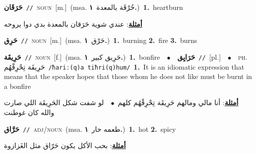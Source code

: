\documentclass[10pt,a4paper,twoside]{article} %
\begin{document}
\begin{multicols}{2}
{\setlength\topsep{0pt}\textbf{\foreignlanguage{arabic}{حَرَقَان}}\ {\color{gray}\texttt{//}\color{black}}\ \textsc{noun}\ [m.]\ \color{gray}(msa. \foreignlanguage{arabic}{حُرْقَة بالمعدة}~\foreignlanguage{arabic}{\textbf{١.}})\color{black}\ \textbf{1.}~heartburn\  \begin{flushright}\color{gray}\foreignlanguage{arabic}{\textbf{\underline{\foreignlanguage{arabic}{أمثلة}}}: عندي شوية حَرَقان بالمعدة بدي دوا يروحه}\end{flushright}\color{black}} \vspace{2mm}

{\setlength\topsep{0pt}\textbf{\foreignlanguage{arabic}{حَرِق}}\ {\color{gray}\texttt{//}\color{black}}\ \textsc{noun}\ [m.]\ \color{gray}(msa. \foreignlanguage{arabic}{حَرْق}~\foreignlanguage{arabic}{\textbf{١.}})\color{black}\ \textbf{1.}~burning  \textbf{2.}~fire  \textbf{3.}~burns\ } \vspace{2mm}

{\setlength\topsep{0pt}\textbf{\foreignlanguage{arabic}{حَرِيقَة}}\ {\color{gray}\texttt{//}\color{black}}\ \textsc{noun}\ [f.]\ \color{gray}(msa. \foreignlanguage{arabic}{حَرِيق كبير}~\foreignlanguage{arabic}{\textbf{١.}})\color{black}\ \textbf{1.}~bonfire\ \ $\bullet$\ \ \setlength\topsep{0pt}\textbf{\foreignlanguage{arabic}{حَرَايِق}}\ {\color{gray}\texttt{//}\color{black}}\ [pl.]\ \ $\bullet$\ \ \textsc{ph.} \color{gray} \foreignlanguage{arabic}{حَرِيقَة تِحْرِقْهُم}\color{black}\ {\color{gray}\texttt{/{\sffamily ħariː(q)a tiħri(q)hum}/}\color{black}}\ \textbf{1.}~It is an idiomatic expression that means that the speaker hopes that those whom he does not like must be burnt in a bonfire\  \begin{flushright}\color{gray}\foreignlanguage{arabic}{\textbf{\underline{\foreignlanguage{arabic}{أمثلة}}}: أنا مالي ومالهم حَرِيقَة تِحْرِقْهُم كلهم\ $\bullet$\ \  لو شفت شكل الحَرِيقَة اللي صارت والله كان غوطنت}\end{flushright}\color{black}} \vspace{2mm}

{\setlength\topsep{0pt}\textbf{\foreignlanguage{arabic}{حَرَّاق}}\ {\color{gray}\texttt{//}\color{black}}\ \textsc{adj/noun}\ \color{gray}(msa. \foreignlanguage{arabic}{طعمه حار}~\foreignlanguage{arabic}{\textbf{١.}})\color{black}\ \textbf{1.}~hot  \textbf{2.}~spicy\  \begin{flushright}\color{gray}\foreignlanguage{arabic}{\textbf{\underline{\foreignlanguage{arabic}{أمثلة}}}: بحب الأكل يكون حَرّاق مثل الغَزازوة}\end{flushright}\color{black}} \vspace{2mm}


\end{multicols}
\end{document}
